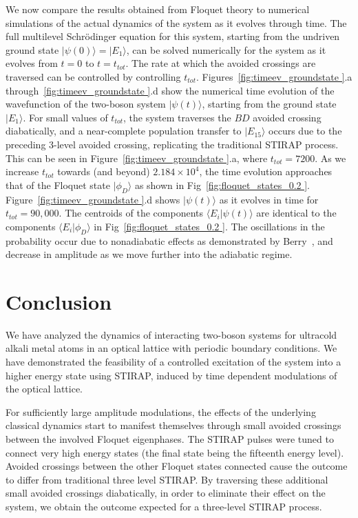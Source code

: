 \documentclass{article}
\begin{document}
We now compare the results obtained from Floquet theory to numerical simulations of the actual dynamics of the system as it evolves through time. The full multilevel Schr\"odinger equation for this system, starting from the undriven ground state $|{\psi}(0){\rangle}=\vert E_1\rangle$, can be solved numerically for the system as it evolves from $t=0$ to $t=t_{tot}$. The rate at which the avoided crossings are traversed can be controlled by controlling $t_{tot}$. Figures~\ref{fig:timeev_groundstate }.a through~\ref{fig:timeev_groundstate }.d show the numerical time evolution of the wavefunction of the two-boson system $\vert \psi(t)\rangle$, starting from the ground state $\vert E_1\rangle$. For small values of $t_{tot}$, the system traverses the $BD$ avoided crossing diabatically, and a near-complete population transfer to $\vert E_{15}\rangle$ occurs due to the preceding 3-level avoided crossing, replicating the traditional STIRAP process. This can be seen in Figure~\ref{fig:timeev_groundstate }.a, where $t_{tot}=7200$. As we increase $t_{tot}$ towards (and beyond) $2.184 \times 10^4$, the time evolution approaches that of the Floquet state $\vert \phi_D\rangle$ as shown in Fig~\ref{fig:floquet_states_0.2 }. Figure~\ref{fig:timeev_groundstate }.d shows $\vert \psi(t)\rangle$ as it evolves in time for $t_{tot}=90,000$. The centroids of the components $\langle E_i \vert \psi(t)\rangle$ are identical to the components  $\langle E_i \vert \phi_D\rangle$ in Fig~\ref{fig:floquet_states_0.2
 }. The oscillations in the probability occur due to nonadiabatic effects as demonstrated by Berry~\cite{berry:base}, and decrease in amplitude as we move further into the adiabatic regime. 
%
%
\section{Conclusion}
\label{conclusion}
%
%
We have analyzed the dynamics of interacting two-boson systems for ultracold alkali metal atoms in an optical lattice with periodic boundary conditions.  We have demonstrated the feasibility of a controlled excitation of the system into a higher energy state using STIRAP, induced by time dependent modulations of the optical lattice. 

For sufficiently large amplitude modulations, the effects of the underlying classical dynamics \cite{reichl}  start to manifest themselves through small avoided crossings between the involved Floquet eigenphases. The STIRAP pulses were tuned to connect very high energy states (the final state being the fifteenth energy level). Avoided crossings between the other Floquet states connected  cause the outcome  to differ from  traditional three level STIRAP.  By traversing these additional small avoided  crossings  diabatically, in order to eliminate their effect on the system, we obtain the outcome expected for a three-level STIRAP process. 
%
%
\end{document}
